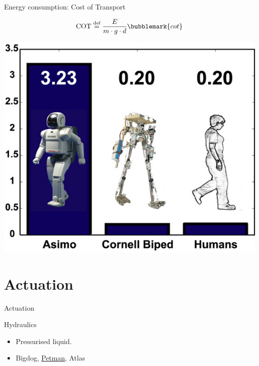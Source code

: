\documentclass[compress]{beamer}
\begin{document}
\begin{frame}{Energy consumption: Cost of Transport}
    
    \Large
    \[
        \mathrm{COT} \overset{\text{def}}= \frac{E}{m\cdot g\cdot d}\bubblemark{cot}
    \]

    \begin{center}
        \includegraphics[width=0.6\linewidth]{cost_of_transport}
    \end{center}

\end{frame}

\section{Actuation}

\begin{frame}{Actuation}

    Hydraulics

    \begin{itemize}

        \item Pressurised liquid.
        \item Bigdog, \href{http://www.youtube.com/watch?v=QRbvNL1PHKg}{Petman}, Atlas
    \end{itemize}
\end{frame}

\end{document}
